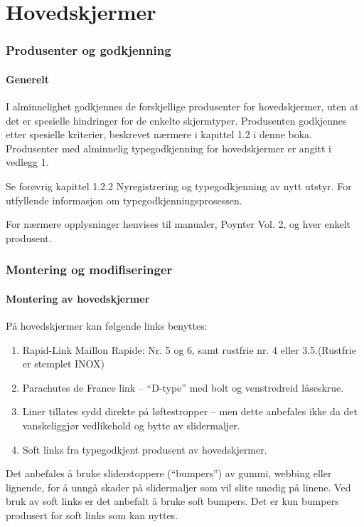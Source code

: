 \part{Hovedskjermer}

\section{Produsenter og godkjenning}
\subsection{Generelt}
I alminnelighet godkjennes de forskjellige produsenter for hovedskjermer, uten at det er spesielle hindringer for de enkelte skjermtyper. Produsenten godkjennes etter spesielle kriterier, beskrevet nærmere i kapittel 1.2 i denne boka. Produsenter med alminnelig typegodkjenning for hovedskjermer er angitt i vedlegg 1.

Se forøvrig kapittel 1.2.2 Nyregistrering og typegodkjenning av nytt utstyr. For utfyllende informasjon om typegodkjenningsprosessen.

For nærmere opplysninger henvises til manualer, Poynter Vol. 2, og hver enkelt produsent.

\section{Montering og modifiseringer}
\subsection{Montering av hovedskjermer}
På hovedskjermer kan følgende links benyttes:
\begin{enumerate}
	\item Rapid-Link Maillon Rapide: Nr. 5 og 6, samt rustfrie nr. 4 eller 3.5.(Rustfrie er stemplet INOX)
	\item Parachutes de France link – ``D-type'' med bolt og venstredreid låseskrue.
	\item Liner tillates sydd direkte på løftestropper – men dette anbefales ikke da det vanskeliggjør vedlikehold og bytte av slidermaljer.
	\item Soft links fra typegodkjent produsent av hovedskjermer.
\end{enumerate}

Det anbefales å bruke sliderstoppere (``bumpers'') av gummi, webbing eller lignende, for å unngå skader på slidermaljer som vil slite unødig på linene. Ved bruk av soft links er det anbefalt å bruke soft bumpers. Det er kun bumpers produsert for soft links som kan nyttes.

